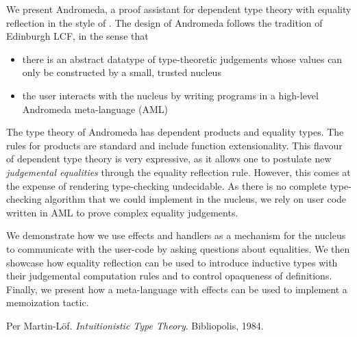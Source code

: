 \documentclass[a4paper,UKenglish]{dagrep}
\begin{document}
\license
{}

We present Andromeda, a proof assistant for dependent type theory with
equality reflection in the style of \cite{ML84}. The design of Andromeda follows the
tradition of Edinburgh LCF, in the sense that
\begin{itemize}
\item there is an abstract datatype of type-theoretic judgements whose values can
    only be constructed by a small, trusted nucleus
\item the user interacts with the nucleus by writing programs in a high-level Andromeda meta-language (AML)
\end{itemize}

The type theory of Andromeda has dependent products and equality types. The
rules for products are standard and include function extensionality. This
flavour of dependent type theory is very expressive, as it allows one to
postulate new \emph{judgemental equalities} through the equality reflection
rule. However, this comes at the expense of rendering type-checking
undecidable. As there is no complete type-checking algorithm that we could
implement in the nucleus, we rely on user code written in AML to prove complex
equality judgements.

We demonstrate how we use effects and handlers as a mechanism for the nucleus
to communicate with the user-code by asking questions about equalities. We then
showcase how equality reflection can be used to introduce inductive types with
their judgemental computation rules and to control opaqueness of definitions.
Finally, we present how a meta-language with effects can be used to implement a
memoization tactic.

\begin{thebibliography}{0}
 Per Martin-Löf. \emph{Intuitionistic Type Theory}. Bibliopolis, 1984.
\end{thebibliography}

\license
\end{document}
